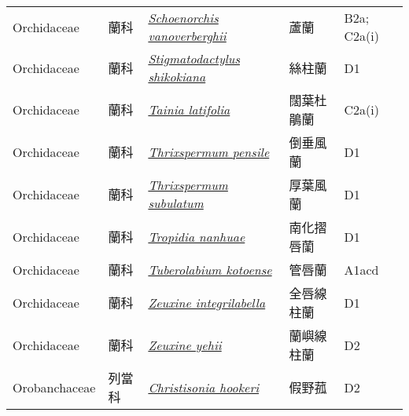 {\begin{longtable}{p{2.5cm}p{2.5cm}p{4.5cm}p{2.5cm}p{3cm}}
    Orchidaceae & 蘭科 & \href{http://www.theplantlist.org/tpl1.1/search?q=Schoenorchis+vanoverberghii}{\textit{Schoenorchis vanoverberghii} } & 蘆蘭 & B2a; C2a(i) \index{Schoenorchis@\textit{Schoenorchis}!vanoverberghii@\textit{vanoverberghii}}  \index{蘆蘭} \\
    Orchidaceae & 蘭科 & \href{http://www.theplantlist.org/tpl1.1/search?q=Stigmatodactylus+shikokiana}{\textit{Stigmatodactylus shikokiana} } & 絲柱蘭 & D1 \index{Stigmatodactylus@\textit{Stigmatodactylus}!shikokiana@\textit{shikokiana}}  \index{絲柱蘭} \\
    Orchidaceae & 蘭科 & \href{http://www.theplantlist.org/tpl1.1/search?q=Tainia+latifolia}{\textit{Tainia latifolia} } & 闊葉杜鵑蘭 & C2a(i) \index{Tainia@\textit{Tainia}!latifolia@\textit{latifolia}}  \index{闊葉杜鵑蘭} \\
    Orchidaceae & 蘭科 & \href{http://www.theplantlist.org/tpl1.1/search?q=Thrixspermum+pensile}{\textit{Thrixspermum pensile} } & 倒垂風蘭 & D1 \index{Thrixspermum@\textit{Thrixspermum}!pensile@\textit{pensile}}  \index{倒垂風蘭} \\
    Orchidaceae & 蘭科 & \href{http://www.theplantlist.org/tpl1.1/search?q=Thrixspermum+subulatum}{\textit{Thrixspermum subulatum} } & 厚葉風蘭 & D1 \index{Thrixspermum@\textit{Thrixspermum}!subulatum@\textit{subulatum}}  \index{厚葉風蘭} \\
    Orchidaceae & 蘭科 & \href{http://www.theplantlist.org/tpl1.1/search?q=Tropidia+nanhuae}{\textit{Tropidia nanhuae} } & 南化摺唇蘭 & D1 \index{Tropidia@\textit{Tropidia}!nanhuae@\textit{nanhuae}}  \index{南化摺唇蘭} \\
    Orchidaceae & 蘭科 & \href{http://www.theplantlist.org/tpl1.1/search?q=Tuberolabium+kotoense}{\textit{Tuberolabium kotoense} } & 管唇蘭 & A1acd \index{Tuberolabium@\textit{Tuberolabium}!kotoense@\textit{kotoense}}  \index{管唇蘭} \\
    Orchidaceae & 蘭科 & \href{http://www.theplantlist.org/tpl1.1/search?q=Zeuxine+integrilabella}{\textit{Zeuxine integrilabella} } & 全唇線柱蘭 & D1 \index{Zeuxine@\textit{Zeuxine}!integrilabella@\textit{integrilabella}}  \index{全唇線柱蘭} \\
    Orchidaceae & 蘭科 & \href{http://www.theplantlist.org/tpl1.1/search?q=Zeuxine+yehii}{\textit{Zeuxine yehii} } & 蘭嶼線柱蘭 & D2 \index{Zeuxine@\textit{Zeuxine}!yehii@\textit{yehii}}  \index{蘭嶼線柱蘭} \\
    Orobanchaceae & 列當科 & \href{http://www.theplantlist.org/tpl1.1/search?q=Christisonia+hookeri}{\textit{Christisonia hookeri} } & 假野菰 & D2 \index{Christisonia@\textit{Christisonia}!hookeri@\textit{hookeri}}  \index{假野菰} \\

\end{longtable}}
